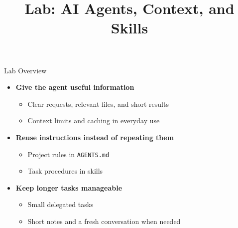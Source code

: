 \newcommand{\CourseTemplatePath}{../../../../../templates/slides/}

\title[AI Agents, Context, and Skills]{Lab: AI Agents, Context, and Skills}

\makecoursetitle

\begin{frame}{Lab Overview}
\small
\begin{itemize}
\item \textbf{Give the agent useful information}
\begin{itemize}\item Clear requests, relevant files, and short results\item Context limits and caching in everyday use\end{itemize}
\item \textbf{Reuse instructions instead of repeating them}
\begin{itemize}\item Project rules in \texttt{AGENTS.md}\item Task procedures in skills\end{itemize}
\item \textbf{Keep longer tasks manageable}
\begin{itemize}\item Small delegated tasks\item Short notes and a fresh conversation when needed\end{itemize}
\end{itemize}
\end{frame}

